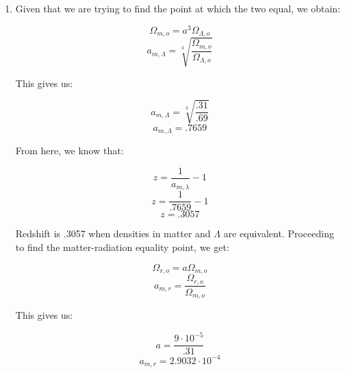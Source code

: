 \begin{enumerate}
\begin{enumerate}
        $$\chi_{hor}=\int_0^1 \frac{da}{a^{.5}H_o}$$
        $$\chi_{hor}=\frac{2\sqrt{a}}{H_o}\Big_0^1$$
        $$\boxed{\chi_{hor}=\frac{2}{H_o}}$$

      \item 

        For a radiation-dominated universe, we get:

        $$\frac{da}{dt}=\frac{H_o}{a}$$
        $$\int a\,da=\int H_o\,dt$$
        $$\frac{1}{2}a^2=H_ot$$
        $$\boxed{a(t)=\sqrt{4H_ot}}$$

        From here, we can find the age as:

        $$1=\sqrt{4H_ot_o}$$
        $$\boxed{t_o=\frac{1}{4H_o}}$$

        Finally, we find the horizon distance:

        $$\chi_{hor}=\int_0^1\frac{da}{a^2H_o}$$
        $$\chi_{hor}=-\frac{1}{aH_o}\Big_0^1$$
        $$\chi_{hor}=-\frac{1}{H_o}$$

      \item 

      \item 

      \item 

      \item 

    \end{enumerate}

  \item Given that we are trying to find the point at which the two equal, we obtain:

    $$\Omega_{m,o}=a^3\Omega_{\Lambda,o}$$
    $$a_{m,\Lambda}=\sqrt[3]{\frac{\Omega_{m,o}}{\Omega_{\Lambda,o}}}$$

    This gives us:

    $$a_{m,\Lambda}=\sqrt[3]{\frac{.31}{.69}}$$
    $$\boxed{a_{m,\Lambda}=.7659}$$

    From here, we know that:

    $$z=\frac{1}{a_{m,\lambda}}-1$$
    $$z=\frac{1}{.7659}-1$$
    $$\boxed{z=.3057}$$

    Redshift is .3057 when densities in matter and $\Lambda$ are equivalent.  Proceeding to find the matter-radiation equality point, we get:

    $$\Omega_{r,o}=a\Omega_{m,o}$$
    $$a_{m,r}=\frac{\Omega_{r,o}}{\Omega_{m,o}}$$

    This gives us:

    $$a=\frac{9\cdot10^{-5}}{.31}$$
    $$\boxed{a_{m,r}=2.9032\cdot10^{-4}}$$


\end{enumerate}
